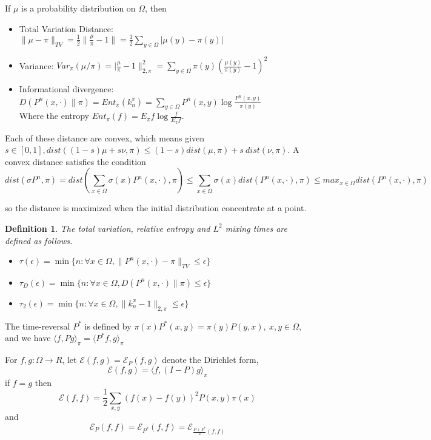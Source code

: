 \documentclass[12pt,reqno]{amsart}
\newtheorem{definition}[thm]{Definition}
{ \theoremstyle{remark}\newtheorem*{remark}{Remark} }
\begin{document}
If $\mu$ is a probability distribution on $\Omega$, then
\begin{itemize}
\item Total Variation Distance: 
  $\|\mu-\pi\|_{TV} = \frac{1}{2}\|\frac{\mu}{\pi} -1 \| = 
  \frac{1}{2} \sum_{y\in\Omega} |\mu(y)-\pi(y)|$
\item Variance:
  $Var_{\pi}(\mu/\pi) = |\frac{\mu}{\pi}-1 \|_{2,\pi}^2 = 
  \sum_{y\in\Omega}\pi(y)(\frac{\mu(y)}{\pi(y)} -1)^2$
\item Informational divergence:
  $D(P^n(x,\cdot)\|\pi) = Ent_{\pi}(k_n^x) = 
  \sum_{y\in\Omega}P^n(x,y)\log\frac{P^n(x,y)}{\pi(y)}$\\
  Where the entropy $Ent_{\pi}(f)=E_{\pi}f\log\frac{f}{E_{\pi}f}$.
\end{itemize}
Each of these distance are convex, which means given $s\in[0,1], dist((1-s)\mu + s\nu, \pi)\leq (1-s)dist(\mu,\pi) + s~dist(\nu,\pi)$. A convex distance satisfies the condition
\begin{equation}
  \label{eq:1.1}
dist(\sigma P^n,\pi) = dist  (\sum_{x\in\Omega}\sigma(x)P^n(x,\cdot),\pi )
\leq \sum_{x\in\Omega}\sigma(x) dist( P^n(x,\cdot),\pi )
\leq max_{x\in\Omega}dist( P^n(x,\cdot),\pi ) 
\end{equation}



so the distance is maximized when the initial distribution concentrate at a point.

\begin{definition}
The total variation, relative entropy and $L^2$ mixing times are defined as follows.
\begin{itemize}
\item $\tau(\epsilon) = \min\{n:\forall x\in \Omega, \|P^n(x,\cdot)-\pi\|_{TV}\leq \epsilon\}$
\item $\tau_D(\epsilon) = \min\{n:\forall x\in \Omega, D(P^n(x,\cdot)\|\pi) \leq \epsilon\}$
\item $\tau_2(\epsilon) = \min\{n:\forall x\in \Omega, \|k_n^x-1\|_{2,\pi} \leq \epsilon\}$
\end{itemize}
\end{definition}

The time-reversal $P^*$ is defined by $\pi(x)P^*(x,y) = \pi(y)P(y,x),~x,y\in\Omega$, 
and we have $\langle f,Pg\rangle_{\pi}=\langle P^*f,g\rangle_{\pi}$

For $f,g:\Omega\rightarrow R$, let $\mathcal{E}(f,g) = \mathcal{E}_P(f,g)$ denote the Dirichlet form,
\begin{equation}
  \mathcal{E}(f,g) = \langle f,(I-P)g \rangle_{\pi}
\end{equation}
if $f=g$ then
\begin{equation}
  \mathcal{E}(f,f) = \frac{1}{2}\sum_{x,y}(f(x)-f(y))^2P(x,y)\pi(x)
\end{equation}
and
\begin{equation}
  \mathcal{E}_P(f,f) = \mathcal{E}_{P^*}(f,f) = \mathcal{E}_{\frac{P+P^*}{2}(f,f)}
\end{equation}
\end{document}

